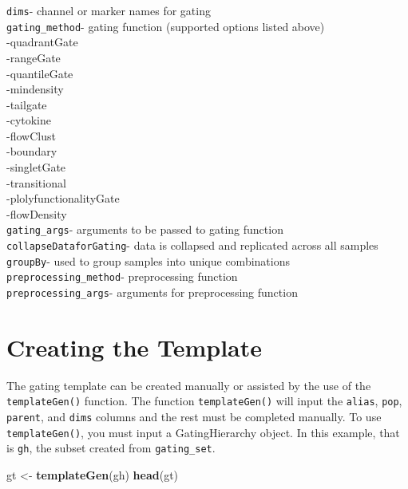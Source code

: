 \documentclass[]{book}
\newenvironment{Shaded}{\begin{snugshade}}{\end{snugshade}}
\newcommand{\KeywordTok}[1]{\textcolor[rgb]{0.13,0.29,0.53}{\textbf{#1}}}
\newcommand{\NormalTok}[1]{#1}
\newcommand{\StringTok}[1]{\textcolor[rgb]{0.31,0.60,0.02}{#1}}
\begin{document}
\texttt{dims}- channel or marker names for gating\\
\texttt{gating\_method}- gating function (supported options listed above)\\
-quadrantGate\\
-rangeGate\\
-quantileGate\\
-mindensity\\
-tailgate\\
-cytokine\\
-flowClust\\
-boundary\\
-singletGate\\
-transitional\\
-plolyfunctionalityGate\\
-flowDensity\\
\texttt{gating\_args}- arguments to be passed to gating function
\texttt{collapseDataforGating}- data is collapsed and replicated across all samples\\
\texttt{groupBy}- used to group samples into unique combinations\\
\texttt{preprocessing\_method}- preprocessing function\\
\texttt{preprocessing\_args}- arguments for preprocessing function

\hypertarget{creating-the-template}{%
\section{Creating the Template}\label{creating-the-template}}

The gating template can be created manually or assisted by the use of the \texttt{templateGen()} function. The function \texttt{templateGen()} will input the \texttt{alias}, \texttt{pop}, \texttt{parent}, and \texttt{dims} columns and the rest must be completed manually. To use \texttt{templateGen()}, you must input a GatingHierarchy object. In this example, that is \texttt{gh}, the subset created from \texttt{gating\_set}.

\begin{Shaded}
\begin{Highlighting}[]
\NormalTok{gt <-}\StringTok{ }\KeywordTok{templateGen}\NormalTok{(gh)}
\KeywordTok{head}\NormalTok{(gt)}
\end{Highlighting}
\end{Shaded}
\end{document}
